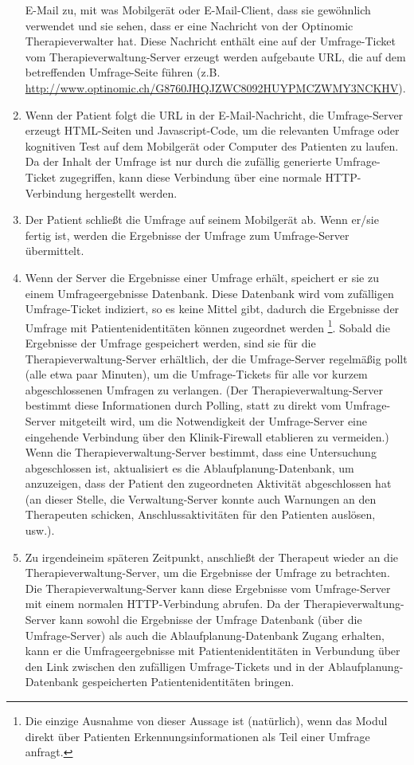 \documentclass[DIV=calc,paper=a4,fontsize=11pt,twocolumn]{scrartcl}
\begin{document}
\begin{enumerate}
{    E-Mail zu, mit was Mobilgerät oder E-Mail-Client, dass sie
    gewöhnlich verwendet und sie sehen, dass er eine Nachricht von der
    Optinomic Therapieverwalter hat. Diese Nachricht enthält eine auf
    der Umfrage-Ticket vom Therapieverwaltung-Server erzeugt werden
    aufgebaute URL, die auf dem betreffenden Umfrage-Seite führen
    (z.B.
    \url{http://www.optinomic.ch/G8760JHQJZWC8092HUYPMCZWMY3NCKHV}).}
  \item{Wenn der Patient folgt die URL in der E-Mail-Nachricht, die
    Umfrage-Server erzeugt HTML-Seiten und Javascript-Code, um die
    relevanten Umfrage oder kognitiven Test auf dem Mobilgerät oder
    Computer des Patienten zu laufen. Da der Inhalt der Umfrage ist
    nur durch die zufällig generierte Umfrage-Ticket zugegriffen, kann
    diese Verbindung über eine normale HTTP-Verbindung hergestellt
    werden.}
  \item{Der Patient schließt die Umfrage auf seinem Mobilgerät
    ab. Wenn er/sie fertig ist, werden die Ergebnisse der Umfrage zum
    Umfrage-Server übermittelt.}
  \item{Wenn der Server die Ergebnisse einer Umfrage erhält, speichert
    er sie zu einem Umfrageergebnisse Datenbank. Diese Datenbank wird
    vom zufälligen Umfrage-Ticket indiziert, so es keine Mittel gibt,
    dadurch die Ergebnisse der Umfrage mit Patientenidentitäten können
    zugeordnet werden \footnote{Die einzige Ausnahme von dieser
      Aussage ist (natürlich), wenn das Modul direkt über Patienten
      Erkennungsinformationen als Teil einer Umfrage anfragt.}.
    Sobald die Ergebnisse der Umfrage gespeichert werden, sind sie für
    die Therapieverwaltung-Server erhältlich, der die Umfrage-Server
    regelmäßig pollt (alle etwa paar Minuten), um die Umfrage-Tickets
    für alle vor kurzem abgeschlossenen Umfragen zu verlangen. (Der
    Therapieverwaltung-Server bestimmt diese Informationen durch
    Polling, statt zu direkt vom Umfrage-Server mitgeteilt wird, um
    die Notwendigkeit der Umfrage-Server eine eingehende Verbindung
    über den Klinik-Firewall etablieren zu vermeiden.)  Wenn die
    Therapieverwaltung-Server bestimmt, dass eine Untersuchung
    abgeschlossen ist, aktualisiert es die Ablaufplanung-Datenbank, um
    anzuzeigen, dass der Patient den zugeordneten Aktivität
    abgeschlossen hat (an dieser Stelle, die Verwaltung-Server konnte
    auch Warnungen an den Therapeuten schicken, Anschlussaktivitäten
    für den Patienten auslösen, usw.).}
  \item{Zu irgendeineim späteren Zeitpunkt, anschließt der Therapeut
    wieder an die Therapieverwaltung-Server, um die Ergebnisse der
    Umfrage zu betrachten. Die Therapieverwaltung-Server kann diese
    Ergebnisse vom Umfrage-Server mit einem normalen HTTP-Verbindung
    abrufen. Da der Therapieverwaltung-Server kann sowohl die
    Ergebnisse der Umfrage Datenbank (über die Umfrage-Server) als
    auch die Ablaufplanung-Datenbank Zugang erhalten, kann er die
    Umfrageergebnisse mit Patientenidentitäten in Verbundung über den
    Link zwischen den zufälligen Umfrage-Tickets und in der
    Ablaufplanung-Datenbank gespeicherten Patientenidentitäten
    bringen.}
\end{enumerate}
\end{document}
